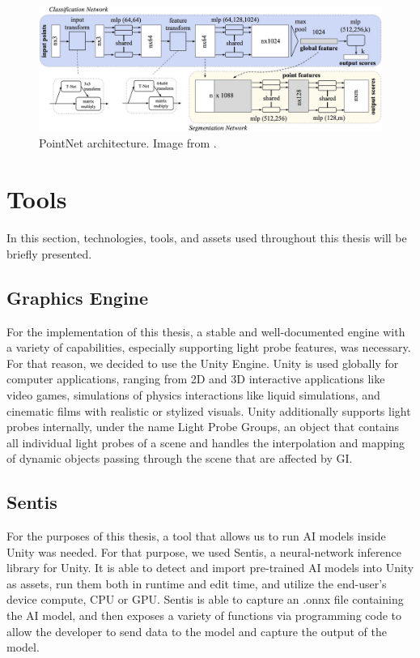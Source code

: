 \begin{figure}[h]
	\centering
	\includegraphics[width=\linewidth]{Graphics/pointnet.jpg}
	\caption{PointNet architecture. Image from \cite{PointNet2017}.}
	\label{fig:pointnet}
\end{figure}

\section{Tools} %
In this section, technologies, tools, and assets used throughout this thesis will be briefly presented.

\subsection{Graphics Engine}
For the implementation of this thesis, a stable and well-documented engine with a variety of capabilities, especially supporting light probe features, was necessary. For that reason, we decided to use the Unity Engine. Unity is used globally for computer applications, ranging from 2D and 3D interactive applications like video games, simulations of physics interactions like liquid simulations, and cinematic films with realistic or stylized visuals. Unity additionally supports light probes internally, under the name Light Probe Groups, an object that contains all individual light probes of a scene and handles the interpolation and mapping of dynamic objects passing through the scene that are affected by GI.

\subsection{Sentis}
For the purposes of this thesis, a tool that allows us to run AI models inside Unity was needed. For that purpose, we used Sentis, a neural-network inference library for Unity. It is able to detect and import pre-trained AI models into Unity as assets, run them both in runtime and edit time, and utilize the end-user's device compute, CPU or GPU. Sentis is able to capture an .onnx file containing the AI model, and then exposes a variety of functions via programming code to allow the developer to send data to the model and capture the output of the model.

